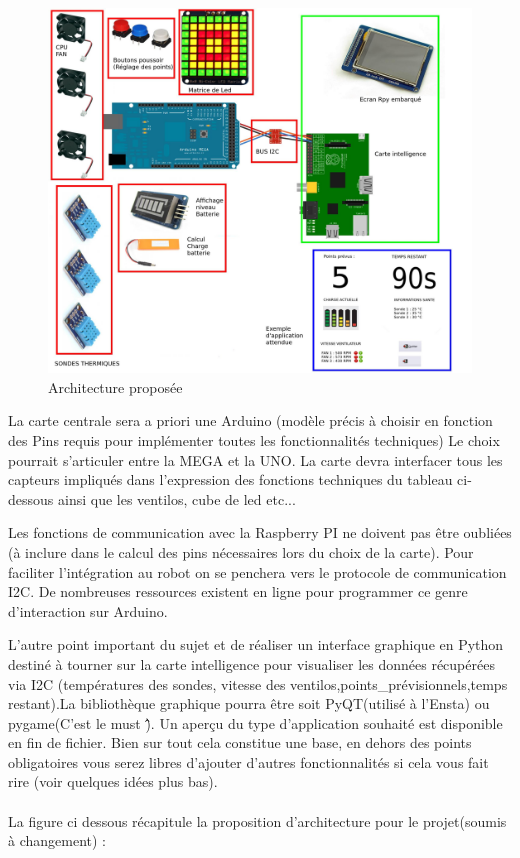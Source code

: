 \documentclass[fleqn,10pt]{SelfArx} %
\begin{document}
\begin{figure}[ht]\centering %
\includegraphics[width=\linewidth]{view}
\caption{Architecture proposée}
\label{fig:view}
\end{figure}
La carte centrale sera a priori une Arduino (modèle précis à choisir en fonction des Pins requis pour implémenter toutes les fonctionnalités techniques) Le choix pourrait s'articuler entre la MEGA et la UNO. La carte devra interfacer tous les capteurs impliqués dans l'expression des fonctions techniques du tableau ci-dessous ainsi que les ventilos, cube de led etc... 

 Les fonctions de communication avec la Raspberry PI ne doivent pas être oubliées (à inclure dans le calcul des pins nécessaires lors du choix de la carte). Pour faciliter l'intégration au robot on se penchera vers le protocole de communication I2C. De nombreuses ressources existent en ligne pour programmer ce genre d'interaction sur Arduino. 
 
 
L'autre point important du sujet et de réaliser un interface graphique en Python destiné à tourner sur la carte intelligence pour visualiser les données récupérées via I2C (températures des sondes, vitesse des ventilos,points\_prévisionnels,temps restant).La bibliothèque graphique pourra être soit PyQT(utilisé à l'Ensta) ou pygame(C'est le must \^\^). Un aperçu du type d'application souhaité est disponible en fin de fichier. Bien sur tout cela constitue une base, en dehors des points obligatoires vous serez libres d'ajouter d'autres fonctionnalités si cela vous fait rire (voir quelques idées plus bas).
\\ \\ La figure ci dessous récapitule la proposition d'architecture pour le projet(soumis à changement) : 
\end{document}
